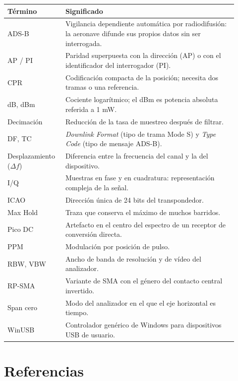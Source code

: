 \begin{longtable}{@{}>{\raggedright\arraybackslash}p{0.22\linewidth}>{\raggedright\arraybackslash}p{0.70\linewidth}@{}}
\toprule
\textbf{Término} & \textbf{Significado} \\
\midrule
\endhead
ADS-B & Vigilancia dependiente automática por radiodifusión: la aeronave difunde sus propios datos sin ser interrogada. \\
AP / PI & Paridad superpuesta con la dirección (AP) o con el identificador del interrogador (PI). \\
CPR & Codificación compacta de la posición; necesita dos tramas o una referencia. \\
dB, dBm & Cociente logarítmico; el dBm es potencia absoluta referida a 1 mW. \\
Decimación & Reducción de la tasa de muestreo después de filtrar. \\
DF, TC & \emph{Downlink Format} (tipo de trama Mode S) y \emph{Type Code} (tipo de mensaje ADS-B). \\
Desplazamiento ($\Delta f$) & Diferencia entre la frecuencia del canal y la del dispositivo. \\
I/Q & Muestras en fase y en cuadratura: representación compleja de la señal. \\
ICAO & Dirección única de 24 bits del transpondedor. \\
Max Hold & Traza que conserva el máximo de muchos barridos. \\
Pico DC & Artefacto en el centro del espectro de un receptor de conversión directa. \\
PPM & Modulación por posición de pulso. \\
RBW, VBW & Ancho de banda de resolución y de vídeo del analizador. \\
RP-SMA & Variante de SMA con el género del contacto central invertido. \\
Span cero & Modo del analizador en el que el eje horizontal es tiempo. \\
WinUSB & Controlador genérico de Windows para dispositivos USB de usuario. \\
\bottomrule
\end{longtable}

\section{Referencias}
\label{sec:a-referencias}

